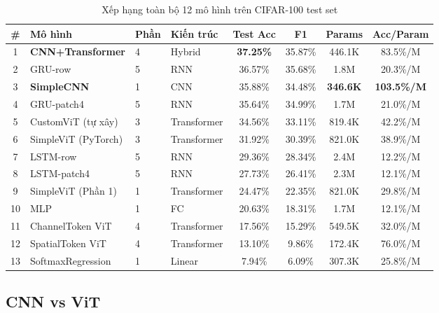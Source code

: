 \documentclass[12pt, a4paper]{article}
\begin{document}
\begin{table}[H]
\centering
\caption{Xếp hạng toàn bộ 12 mô hình trên CIFAR-100 test set}
\small
\begin{tabular}{clllcccc}
\toprule
\textbf{\#} & \textbf{Mô hình} & \textbf{Phần} & \textbf{Kiến trúc} & \textbf{Test Acc} & \textbf{F1} & \textbf{Params} & \textbf{Acc/Param} \\
\midrule
1  & \textbf{CNN+Transformer} & 4 & Hybrid      & \textbf{37.25\%} & 35.87\% & 446.1K  & 83.5\%/M \\
2  & GRU-row                  & 5 & RNN         & 36.57\%          & 35.68\% & 1.8M    & 20.3\%/M \\
3  & \textbf{SimpleCNN}       & 1 & CNN         & 35.88\%          & 34.48\% & \textbf{346.6K} & \textbf{103.5\%/M} \\
4  & GRU-patch4               & 5 & RNN         & 35.64\%          & 34.99\% & 1.7M    & 21.0\%/M \\
5  & CustomViT (tự xây)       & 3 & Transformer & 34.56\%          & 33.11\% & 819.4K  & 42.2\%/M \\
6  & SimpleViT (PyTorch)      & 3 & Transformer & 31.92\%          & 30.39\% & 821.0K  & 38.9\%/M \\
7  & LSTM-row                 & 5 & RNN         & 29.36\%          & 28.34\% & 2.4M    & 12.2\%/M \\
8  & LSTM-patch4              & 5 & RNN         & 27.73\%          & 26.41\% & 2.3M    & 12.1\%/M \\
9  & SimpleViT (Phần 1)       & 1 & Transformer & 24.47\%          & 22.35\% & 821.0K  & 29.8\%/M \\
10 & MLP                      & 1 & FC          & 20.63\%          & 18.31\% & 1.7M    & 12.1\%/M \\
11 & ChannelToken ViT         & 4 & Transformer & 17.56\%          & 15.29\% & 549.5K  & 32.0\%/M \\
12 & SpatialToken ViT         & 4 & Transformer & 13.10\%          &  9.86\% & 172.4K  & 76.0\%/M \\
13 & SoftmaxRegression        & 1 & Linear      &  7.94\%          &  6.09\% & 307.3K  & 25.8\%/M \\
\bottomrule
\end{tabular}
\end{table}

\subsection{CNN vs ViT}
\end{document}
